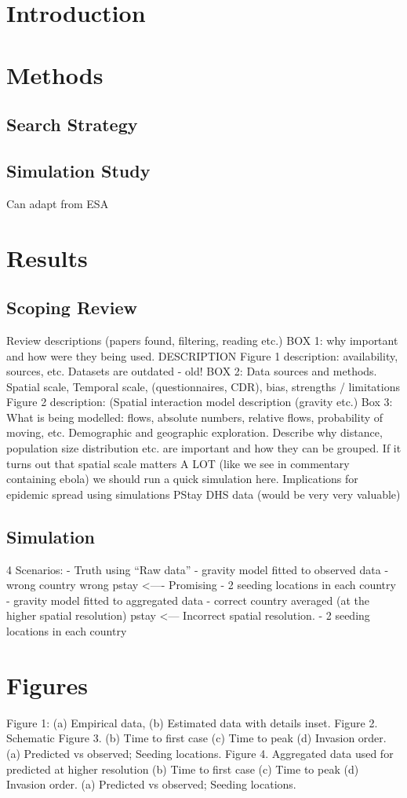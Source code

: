 \documentclass[a4paper,12pt]{article}
\begin{document}
\title{}
\author{}
\section{Introduction}
\section{Methods}
\subsection{Search Strategy}
\subsection{Simulation Study}
Can adapt from ESA
\section{Results}
\subsection{Scoping Review}
Review descriptions (papers found, filtering, reading etc.)
BOX 1: why important and how were they being used. DESCRIPTION
Figure 1 description: availability, sources, etc. 
Datasets are outdated - old!
BOX 2: Data sources and methods. Spatial scale, Temporal scale, (questionnaires, CDR), bias, strengths / limitations
Figure 2 description: (Spatial interaction model description (gravity etc.)
Box 3: What is being modelled: flows, absolute numbers, relative flows, probability of moving, etc. 
Demographic and geographic exploration. Describe why distance, population size distribution etc. are important and how they can be grouped.
If it turns out that spatial scale matters A LOT (like we see in commentary containing ebola) we should run a quick simulation here.
Implications for epidemic spread using simulations
PStay DHS data (would be very very valuable)
\subsection{Simulation}
4 Scenarios: 
- Truth using ``Raw data''
- gravity model fitted to observed data
  - wrong country wrong pstay <---- Promising
  - 2 seeding locations in each country
- gravity model fitted to aggregated data
  - correct country averaged (at the higher spatial resolution) pstay <--- Incorrect spatial resolution.
  - 2 seeding locations in each country


\section{Figures}
Figure 1: (a) Empirical data, (b) Estimated data with details inset.
Figure 2. Schematic 
Figure 3. (b) Time to first case (c) Time to peak (d) Invasion order.
(a) Predicted vs observed; Seeding locations.
Figure 4. Aggregated data used for predicted at
higher resolution (b) Time to first case (c) Time to peak (d) Invasion order.
(a) Predicted vs observed; Seeding locations.
\end{document}
